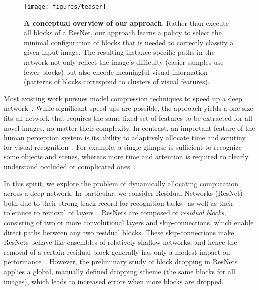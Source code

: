 \documentclass[10pt,twocolumn,letterpaper]{article}
\begin{document}
\begin{figure}[t!]
\centering
\texttt{[image: figures/teaser]}
\vspace{-0.1in}
\caption{ \textbf{A conceptual overview of our approach}. Rather than execute all blocks of a ResNet, our approach learns a policy to select the minimal configuration of blocks that is needed to correctly classify a given input image.  The resulting instance-specific paths in the network not only reflect the image's difficulty (easier samples use fewer blocks) but also encode meaningful visual information (patterns of blocks correspond to clusters of visual features).} 
\label{fig:teaser}
\vspace{-0.2in}
\end{figure}
Most existing work pursues model compression techniques to speed up a deep network~\cite{Hinton15,chenNIPS2017,ioannou2015training,sainath2013low,polyak2015channel,li2016pruning,han2015deep,wu2016quantized,li2017training}.  While significant speed-ups are possible, the approach yields a one-size-fits-all network that requires the same fixed set of features to be extracted for all novel images, no matter their  complexity.  In contrast, an important feature of the human perception system is its ability to adaptively allocate time and scrutiny for visual recognition~\cite{ude2012integrating}. For example, a single glimpse is sufficient to recognize some objects and scenes, whereas more time and attention is required to clearly understand occluded or complicated ones~\cite{walther2011simple}.

In this spirit, we explore the problem of dynamically allocating computation across a deep network.  %
In particular, we consider Residual Networks (ResNet)~\cite{he2015deep} both due to their strong track record for recognition tasks~\cite{he2015deep,dai2016r,he2017mask} as well as their tolerance to removal of  layers~\cite{veit2016residual}.  
ResNets are composed of \emph{residual blocks}, consisting of two or more convolutional layers and skip-connections, which enable direct paths between any two residual blocks. 
These skip-connections %
make ResNets behave like ensembles of relatively shallow networks, and hence the removal of a certain residual block generally has only a modest impact on performance~\cite{veit2016residual}. 
However, the preliminary study of block dropping in ResNets~\cite{veit2016residual} applies a global, manually defined dropping scheme (the same blocks for all images), which leads to increased errors when more blocks are dropped. 
\end{document}
